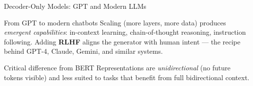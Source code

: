 \documentclass[aspectratio=169]{beamer}
\begin{document}
%
%
\begin{frame}{Decoder-Only Models: GPT and Modern LLMs}
\medskip

\begin{exampleblock}{From GPT to modern chatbots}
  Scaling (more layers, more data) produces \emph{emergent capabilities}:
  in-context learning, chain-of-thought reasoning, instruction following.
  Adding \textbf{RLHF} aligns the generator with human intent --- the
  recipe behind GPT-4, Claude, Gemini, and similar systems.
\end{exampleblock}

\medskip
\begin{alertblock}{Critical difference from BERT}
  Representations are \emph{unidirectional} (no future tokens visible)
  and less suited to tasks that benefit from full bidirectional context.
\end{alertblock}

\end{frame}
%
%
\end{document}
